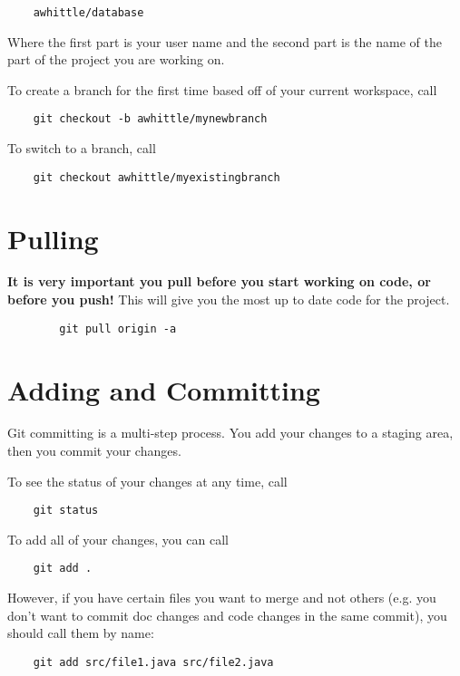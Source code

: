 \documentclass[14pt]{report}
\begin{document}
	\begin{verbatim}
	awhittle/database
	\end{verbatim}
	
	Where the first part is your user name and the second part is the name of the part of the project you are working on.
	
	To create a branch for the first time based off of your current workspace, call
	
	\begin{verbatim}
	git checkout -b awhittle/mynewbranch
	\end{verbatim}
	
	To switch to a branch, call
	
	\begin{verbatim}
	git checkout awhittle/myexistingbranch
	\end{verbatim}

	
	\section{Pulling}
	\textbf{It is very important you pull before you start working on code, or before you push!}
	This will give you the most up to date code for the project.
	
	\begin{verbatim}
		git pull origin -a
	\end{verbatim}
	
	\section{Adding and Committing}
	
	Git committing is a multi-step process. You add your changes to a staging area, then you commit your changes.
	
	To see the status of your changes at any time, call
	
	\begin{verbatim}
	git status
	\end{verbatim}
	
	To add all of your changes, you can call
	\begin{verbatim}
	git add .
	\end{verbatim}
	
	However, if you have certain files you want to merge and not others (e.g. you don't want to commit doc changes and code changes in the same commit), you should call them by name:
	
	\begin{verbatim}
	git add src/file1.java src/file2.java
	\end{verbatim}
	
\end{document}
